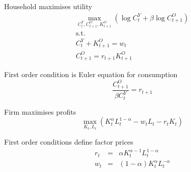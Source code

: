 \documentclass[notes=show]{beamer}
\begin{document}
\begin{frame}%


Household maximises utility%
\begin{gather*}
\underset{C_{t}^{Y},C_{t+1}^{O},K_{t+1}^{O}}{\max }\left( \log
C_{t}^{Y}+\beta \log C_{t+1}^{O}\right) \\
\text{s.t.} \\
C_{t}^{Y}+K_{t+1}^{O}=w_{t} \\
C_{t+1}^{O}=r_{t+1}K_{t+1}^{O}
\end{gather*}

First order condition is Euler equation for consumption%
\begin{equation*}
\frac{C_{t+1}^{O}}{\beta C_{t}^{Y}}=r_{t+1}
\end{equation*}

\transboxout%
\end{frame}%

\begin{frame}%


Firm maximises profits%
\begin{equation*}
\underset{K_{t},L_{t}}{\max }\left( K_{t}^{\alpha }L_{t}^{1-\alpha
}-w_{t}L_{t}-r_{t}K_{t}\right)
\end{equation*}

First order conditions define factor prices%
\begin{eqnarray*}
r_{t} &=&\alpha K_{t}^{\alpha -1}L_{t}^{1-\alpha } \\
w_{t} &=&\left( 1-\alpha \right) K_{t}^{\alpha }L_{t}^{-\alpha }
\end{eqnarray*}

\transboxout%
\end{frame}%
\end{document}
